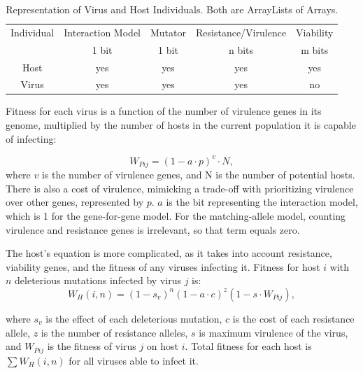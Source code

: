 \documentclass[11pt, oneside]{article}
\begin{document}
\begin{table}[H]
	\begin{center}
	 \begin{tabular}{||c c c c c||} 
	 \hline
	Individual & Interaction Model & Mutator & Resistance/Virulence & Viability\\ 
	& 1 bit & 1 bit & n bits & m bits\\
	 \hline\hline
 	Host & yes & yes & yes & yes\\
	 \hline
 	Virus & yes & yes & yes & no\\
	 \hline
	\end{tabular}
	\caption{Representation of Virus and Host Individuals. Both are ArrayLists of Arrays.}
	\label{table:1}
	\end{center}
\end{table}

Fitness for each virus is a function of the number of virulence genes in its genome, multiplied by the number of hosts in the current population it is capable of infecting:

\begin{equation}
W_{Pij} = (1-a\cdot p)^v\cdot N,
\end{equation}
where $v$ is the number of virulence genes, and N is the number of potential hosts. There is also a cost of virulence, mimicking a trade-off with prioritizing virulence over other genes, represented by $p$. $a$ is the bit representing the interaction model, which is 1 for the gene-for-gene model. For the matching-allele model, counting virulence and resistance genes is irrelevant, so that term equals zero.

The host's equation is more complicated, as it takes into account resistance, viability genes, and the fitness of any viruses infecting it. Fitness for host $i$ with $n$ deleterious mutations infected by virus $j$ is:
\begin{equation}
W_{H}(i,n) = (1-s_{v})^n(1-a\cdot c)^z(1-s\cdot W_{Pij}),
\end{equation}

where $s_{v}$ is the effect of each deleterious mutation, $c$ is the cost of each resistance allele, $z$ is the number of resistance alleles, $s$ is maximum virulence of the virus, and $W_{Pij}$ is the fitness of virus $j$ on host $i$. Total fitness for each host is $\sum W_{H}(i,n)$ for all viruses able to infect it. 
\end{document}
